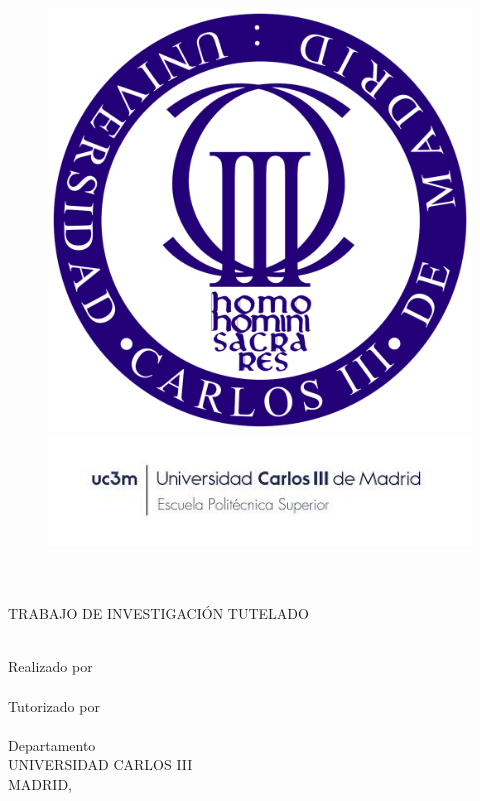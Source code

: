 \begin{center}
\begin{figure}[htbp]
  \centering
  \begin{minipage}[b]{0.2\textwidth}
    \centering
    \includegraphics[width=\textwidth]{images/logo_uc3m.png}
  \end{minipage}
  \hspace{2cm}
  \begin{minipage}[b]{0.6\textwidth}
    \centering
    \includegraphics[width=\textwidth]{images/politecnica_superior.png}
  \end{minipage}
\end{figure}
  \vspace{2cm}
  \MakeUppercase{\facultad} \\
  \MakeUppercase{\grado} \\
  \vspace{2cm}
  \MakeUppercase{Trabajo de investigación tutelado}\\
  \vspace{2cm}
  {\large	\tituloes} \\
  \ifdef{\subtituloes}{
    \textit{\subtituloes} \\
  }{}

  \ifdef{\subtituloen}{
    \textit{\subtituloen} \\
  }{}  \bigbreak
  Realizado por \\
  \textbf{\alumno} \\
  Tutorizado por \\
  \textbf{\tutor} \\
  Departamento \\
  \textbf{\departamento}
  \bigbreak
  UNIVERSIDAD CARLOS III \\
  MADRID, \fecha
\end{center}


